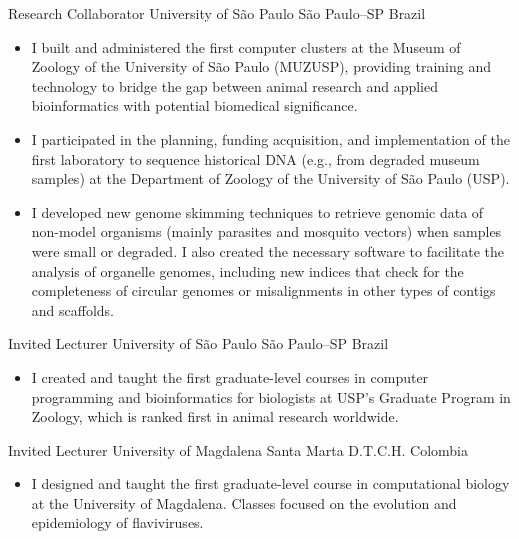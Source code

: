 \documentclass[11pt, letterpaper, sans]{moderncv}
\begin{document}
    \vspace{-0.5em}
    	{Research Collaborator}
    	{University of São Paulo}
    	{São Paulo--SP}
    	{Brazil}
    	{}
    \vspace{-1em}
    \begin{itemize}[itemsep=-0.05in, labelindent=0in, leftmargin=1cm]\small
	    \item[\textcolor{color1}{\textbullet}] I built and administered the first computer clusters at the Museum of Zoology of the University of São Paulo (MUZUSP), providing training and technology to bridge the gap between animal research and applied bioinformatics with potential biomedical significance.
	    \item[\textcolor{color1}{\textbullet}] I participated in the planning, funding acquisition, and implementation of the first laboratory to sequence historical DNA (e.g., from degraded museum samples) at the Department of Zoology of the University of São Paulo (USP).
	    \item[\textcolor{color1}{\textbullet}] I developed new genome skimming techniques to retrieve genomic data of non-model organisms (mainly parasites and mosquito vectors) when samples were small or degraded. I also created the necessary software to facilitate the analysis of organelle genomes, including new indices that check for the completeness of circular genomes or misalignments in other types of contigs and scaffolds.
    \end{itemize}
    	{Invited Lecturer}
    	{University of São Paulo}
    	{São Paulo--SP}
    	{Brazil}
    	{}
    \vspace{-1em}
    \begin{itemize}[itemsep=-0.05in, labelindent=0in, leftmargin=1cm]\small
	    \item[\textcolor{color1}{\textbullet}] I created and taught the first graduate-level courses in computer programming and bioinformatics for biologists at USP's Graduate Program in Zoology, which is ranked first in animal research worldwide.
	\end{itemize}
    \vspace{-0.5em}
    	{Invited Lecturer}
    	{University of Magdalena}
    	{Santa Marta D.T.C.H.}
    	{Colombia}
    	{}
    \vspace{-1em}
    \begin{itemize}[itemsep=-0.05in, labelindent=0in, leftmargin=1cm]\small
	    \item[\textcolor{color1}{\textbullet}] I designed and taught the first graduate-level course in computational biology at the University of Magdalena. Classes focused on the evolution and epidemiology of flaviviruses.
	\end{itemize}
\end{document}
